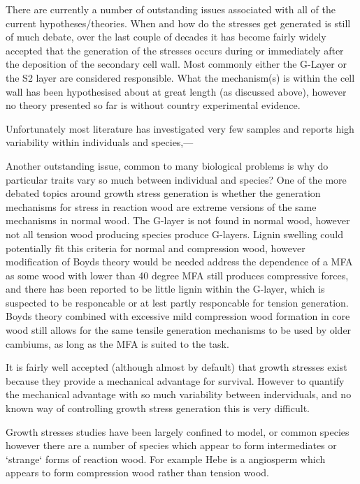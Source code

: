 \documentclass{article}
\begin{document}
There are currently a number of outstanding issues associated with all
of the current hypotheses/theories. When and how do the stresses get
generated is still of much debate, over the last couple of decades it has become
fairly widely accepted that the generation of the stresses occurs during or
immediately after the deposition of the secondary cell wall. Most commonly either
the G-Layer or the S2 layer are considered responsible. What the mechanism(s)
is within the cell wall has been hypothesised about at great length (as
discussed above), however no theory presented so far is without country
experimental evidence.

Unfortunately most literature has investigated very few samples and reports high
variability within individuals and species,---

Another outstanding issue, common to many biological problems is why do
particular traits vary so much between individual and species? One of the
more debated topics around growth stress generation is whether the generation
mechanisms for stress in reaction wood are extreme versions of the same
mechanisms in normal wood. The G-layer is not found in normal wood, however not
all tension wood producing species produce G-layers. Lignin swelling could
potentially fit this criteria for normal and compression wood, however
modification of Boyds theory would be needed address the dependence of a MFA
as some wood with lower than 40 degree MFA still produces compressive forces,
and there has been reported to be little lignin within the G-layer, which is
suspected to be responcable or at lest partly responcable for tension
generation. Boyds theory combined with excessive mild compression wood
formation in core wood still allows for the same tensile generation mechanisms
to be used by older cambiums, as long as the MFA is suited to the task.

It is fairly well accepted (although almost by default) that growth stresses
exist because they provide a mechanical advantage for survival. However to
quantify the mechanical advantage with so much variability between inderviduals,
and no known way of controlling growth stress generation this is very difficult.

Growth stresses studies have been largely confined to model, or common species
however there are a number of species which appear to form intermediates or
`strange` forms of reaction wood. For example Hebe is a angiosperm which appears
to form compression wood rather than tension wood.
\end{document}
